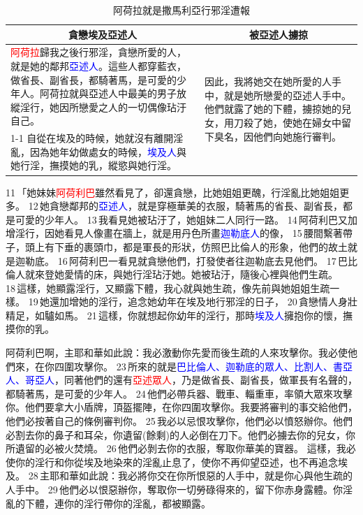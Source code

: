 \begin{table}[H]
\centering
\caption{\label{tab:table-name}阿荷拉就是撒馬利亞行邪淫遭報}
\begin{tabular}{p{}|p{6.0cm}}\hline\hline
\multicolumn{1}{c|}{貪戀埃及亞述人}&\multicolumn{1}{c}{被亞述人擄掠}\\\hline
\textcolor{red}{阿荷拉}歸我之後行邪淫，貪戀所愛的人，就是她的鄰邦\textcolor{blue}{亞述人}。這些人都穿藍衣，做省長、副省長，都騎著馬，是可愛的少年人。阿荷拉就與亞述人中最美的男子放縱淫行，她因所戀愛之人的一切偶像玷汙自己。
&\multirow{2}{6.2cm}{因此，我將她交在她所愛的人手中，就是她所戀愛的亞述人手中。他們就露了她的下體，擄掠她的兒女，用刀殺了她，使她在婦女中留下臭名，因他們向她施行審判。}\\\cline{1-1}
自從在埃及的時候，她就沒有離開淫亂，因為她年幼做處女的時候，\textcolor{blue}{埃及人}與她行淫，撫摸她的乳，縱慾與她行淫。&\\\hline
\end{tabular}
\end{table}
 

11 「她妹妹\textcolor{red}{阿荷利巴}雖然看見了，卻還貪戀，比她姐姐更醜，行淫亂比她姐姐更多。 12 她貪戀鄰邦的\textcolor{blue}{亞述人}，就是穿極華美的衣服，騎著馬的省長、副省長，都是可愛的少年人。 13 我看見她被玷汙了，她姐妹二人同行一路。 14 阿荷利巴又加增淫行，因她看見人像畫在牆上，就是用丹色所畫\textcolor{blue}{迦勒底人}的像， 15 腰間繫著帶子，頭上有下垂的裹頭巾，都是軍長的形狀，仿照巴比倫人的形象，他們的故土就是迦勒底。 16 阿荷利巴一看見就貪戀他們，打發使者往迦勒底去見他們。 17 巴比倫人就來登她愛情的床，與她行淫玷汙她。她被玷汙，隨後心裡與他們生疏。 18 這樣，她顯露淫行，又顯露下體，我心就與她生疏，像先前與她姐姐生疏一樣。 19 她還加增她的淫行，追念她幼年在埃及地行邪淫的日子， 20 貪戀情人身壯精足，如驢如馬。 21 這樣，你就想起你幼年的淫行，那時\textcolor{blue}{埃及人}擁抱你的懷，撫摸你的乳。

阿荷利巴啊，主耶和華如此說：我必激動你先愛而後生疏的人來攻擊你。我必使他們來，在你四圍攻擊你。 23 所來的就是\textcolor{blue}{巴比倫人、迦勒底的眾人、比割人、書亞人、哥亞人}，同著他們的還有\textcolor{red}{亞述眾人}，乃是做省長、副省長，做軍長有名聲的，都騎著馬，是可愛的少年人。 24 他們必帶兵器、戰車、輜重車，率領大眾來攻擊你。他們要拿大小盾牌，頂盔擺陣，在你四圍攻擊你。我要將審判的事交給他們，他們必按著自己的條例審判你。 25 我必以忌恨攻擊你，他們必以憤怒辦你。他們必割去你的鼻子和耳朵，你遺留(餘剩)的人必倒在刀下。他們必擄去你的兒女，你所遺留的必被火焚燒。 26 他們必剝去你的衣服，奪取你華美的寶器。 
這樣，我必使你的淫行和你從埃及地染來的淫亂止息了，使你不再仰望亞述，也不再追念埃及。 28 主耶和華如此說：我必將你交在你所恨惡的人手中，就是你心與他生疏的人手中。 29 他們必以恨惡辦你，奪取你一切勞碌得來的，留下你赤身露體。你淫亂的下體，連你的淫行帶你的淫亂，都被顯露。

